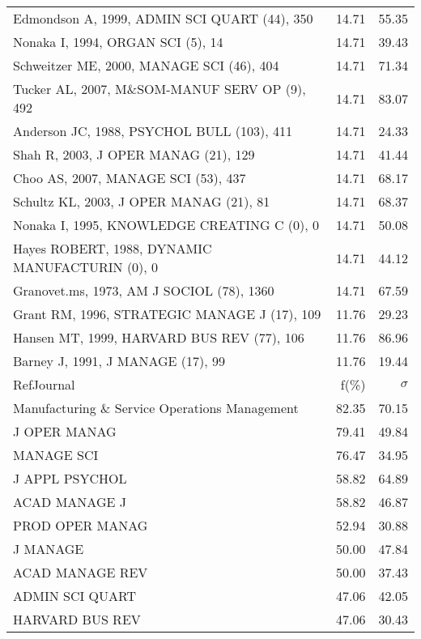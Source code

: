 \documentclass[a4paper,11pt]{report}
\begin{document}
\begin{landscape}
\begin{table}[!ht]
{\begin{tabular}{|l r r|}
Edmondson A, 1999, ADMIN SCI QUART (44), 350 & 14.71 & 55.35\\
Nonaka I, 1994, ORGAN SCI (5), 14 & 14.71 & 39.43\\
Schweitzer ME, 2000, MANAGE SCI (46), 404 & 14.71 & 71.34\\
Tucker AL, 2007, M\&SOM-MANUF SERV OP (9), 492 & 14.71 & 83.07\\
Anderson JC, 1988, PSYCHOL BULL (103), 411 & 14.71 & 24.33\\
Shah R, 2003, J OPER MANAG (21), 129 & 14.71 & 41.44\\
Choo AS, 2007, MANAGE SCI (53), 437 & 14.71 & 68.17\\
Schultz KL, 2003, J OPER MANAG (21), 81 & 14.71 & 68.37\\
Nonaka I, 1995, KNOWLEDGE CREATING C (0), 0 & 14.71 & 50.08\\
Hayes ROBERT, 1988, DYNAMIC MANUFACTURIN (0), 0 & 14.71 & 44.12\\
Granovet.ms, 1973, AM J SOCIOL (78), 1360 & 14.71 & 67.59\\
Grant RM, 1996, STRATEGIC MANAGE J (17), 109 & 11.76 & 29.23\\
Hansen MT, 1999, HARVARD BUS REV (77), 106 & 11.76 & 86.96\\
Barney J, 1991, J MANAGE (17), 99 & 11.76 & 19.44\\
\hline
\hline
RefJournal & f(\%) & $\sigma$\\
\hline
Manufacturing \& Service Operations Management & 82.35 & 70.15\\
J OPER MANAG & 79.41 & 49.84\\
MANAGE SCI & 76.47 & 34.95\\
J APPL PSYCHOL & 58.82 & 64.89\\
ACAD MANAGE J & 58.82 & 46.87\\
PROD OPER MANAG & 52.94 & 30.88\\
J MANAGE & 50.00 & 47.84\\
ACAD MANAGE REV & 50.00 & 37.43\\
ADMIN SCI QUART & 47.06 & 42.05\\
HARVARD BUS REV & 47.06 & 30.43\\
\hline
\end{tabular}
}
\end{table}

\end{landscape}
\end{document}
